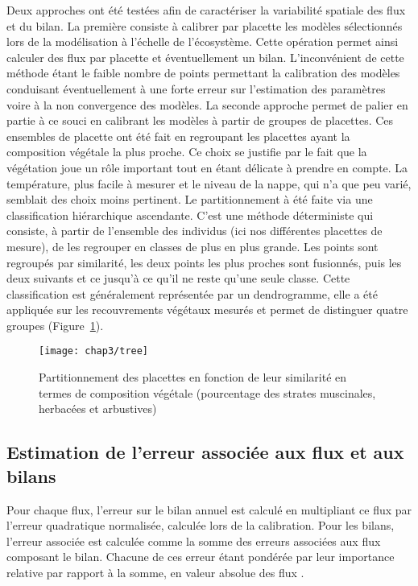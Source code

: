 Deux approches ont été testées afin de caractériser la variabilité spatiale des flux et du bilan.
La première consiste à calibrer par placette les modèles sélectionnés lors de la modélisation à l'échelle de l'écosystème.
Cette opération permet ainsi calculer des flux par placette et éventuellement un bilan.
L'inconvénient de cette méthode étant le faible nombre de points permettant la calibration des modèles conduisant éventuellement à une forte erreur sur l'estimation des paramètres voire à la non convergence des modèles.
La seconde approche permet de palier en partie à ce souci en calibrant les modèles à partir de groupes de placettes.
Ces ensembles de placette ont été fait en regroupant les placettes ayant la composition végétale la plus proche.
Ce choix se justifie par le fait que la végétation joue un rôle important tout en étant délicate à prendre en compte.
La température, plus facile à mesurer et le niveau de la nappe, qui n'a que peu varié, semblait des choix moins pertinent. 
Le partitionnement à été faite via une classification hiérarchique ascendante.
C'est une méthode déterministe qui consiste, à partir de l'ensemble des individus (ici nos différentes placettes de mesure), de les regrouper en classes de plus en plus grande.
Les points sont regroupés par similarité, les deux points les plus proches sont fusionnés, puis les deux suivants et ce jusqu'à ce qu'il ne reste qu'une seule classe.
Cette classification est généralement représentée par un dendrogramme, elle a été appliquée sur les recouvrements végétaux mesurés et permet de distinguer quatre groupes (Figure~\ref{fig:tree}).

\begin{figure}[t]
\centering
\texttt{[image: chap3/tree]}
\caption{Partitionnement des placettes en fonction de leur similarité en termes de composition végétale (pourcentage des strates muscinales, herbacées et arbustives)}
\label{fig:tree}
\end{figure}


\subsection{Estimation de l'erreur associée aux flux et aux bilans}

Pour chaque flux, l'erreur sur le bilan annuel est calculé en multipliant ce flux par l'erreur quadratique normalisée, calculée lors de la calibration.
Pour les bilans, l'erreur associée est calculée comme la somme des erreurs associées aux flux composant le bilan.
Chacune de ces erreur étant pondérée par leur importance relative par rapport à la somme, en valeur absolue des flux \citep{waddington2000}.

